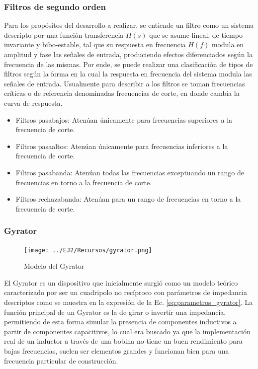 \subsubsection{Filtros de segundo orden}
Para los prop\'ositos del desarrollo a realizar, se entiende un filtro como un sistema descripto por una funci\'on transferencia $H(s)$ que se asume lineal, de tiempo invariante
y bibo-estable, tal que su respuesta en frecuencia $H(f)$ modula en amplitud y fase las se\~nales de entrada, produciendo efectos diferenciados seg\'un la frecuencia de las mismas. Por ende,
se puede realizar una clasificaci\'on de tipos de filtros seg\'un la forma en la cual la respuesta en frecuencia del sistema modula las se\~nales de entrada. Usualmente para describir a los filtros se toman
frecuencias cr\'iticas o de referencia denominadas frecuencias de corte, en donde cambia la curva de respuesta.

\begin{itemize}
    \item Filtros pasabajos: Aten\'uan \'unicamente para frecuencias superiores a la frecuencia de corte.
    \item Filtros pasaaltos: Aten\'uan \'unicamente para frecuencias inferiores a la frecuencia de corte.
    \item Filtros pasabanda: Aten\'uan todas las frecuencias exceptuando un rango de frecuencias en torno a la frecuencia de corte.
    \item Filtros rechazabanda: Aten\'uan para un rango de frecuencias en torno a la frecuencia de corte.
\end{itemize}

\subsubsection{Gyrator}

\begin{figure}[H]
    \centering
    \texttt{[image: ../EJ2/Recursos/gyrator.png]}
    \caption{Modelo del Gyrator}
    \label{fig:gyrator_modelo}
\end{figure}

El Gyrator es un dispositivo que inicialmente surgi\'o como un modelo te\'orico caracterizado por ser un cuadripolo no rec\'iproco con par\'ametros de impedancia
descriptos como se muestra en la expresi\'on de la Ec. \ref{eq:parametros_gyrator}. La funci\'on principal de un Gyrator es la de girar o invertir una impedancia, permitiendo
de esta forma simular la presencia de componentes inductivos a partir de componentes capacitivos, lo cual era buscado ya que la implementaci\'on real de un inductor a trav\'es de una bobina
no tiene un buen rendimiento para bajas frecuencias, suelen ser elementos grandes y funcionan bien para una frecuencia particular de construcci\'on.

